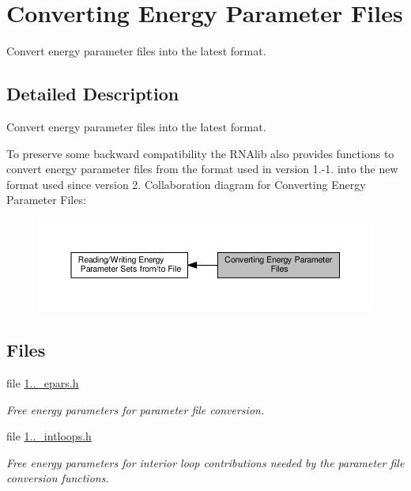 \hypertarget{group__energy__parameters__convert}{}\section{Converting Energy Parameter Files}
\label{group__energy__parameters__convert}


Convert energy parameter files into the latest format.  




\subsection{Detailed Description}
Convert energy parameter files into the latest format. 

To preserve some backward compatibility the R\+N\+Alib also provides functions to convert energy parameter files from the format used in version 1.-\/1. into the new format used since version 2. Collaboration diagram for Converting Energy Parameter Files\+:
\nopagebreak
\begin{figure}[H]
\begin{center}
\leavevmode
\includegraphics[width=350pt]{group__energy__parameters__convert}
\end{center}
\end{figure}
\subsection*{Files}
\begin{DoxyCompactItemize}
\item 
file \hyperlink{1_88_84__epars_8h}{1..\+\_\+epars.\+h}
\begin{DoxyCompactList}\small\item\em Free energy parameters for parameter file conversion. \end{DoxyCompactList}\item 
file \hyperlink{1_88_84__intloops_8h}{1..\+\_\+intloops.\+h}
\begin{DoxyCompactList}\small\item\em Free energy parameters for interior loop contributions needed by the parameter file conversion functions. \end{DoxyCompactList}\end{DoxyCompactItemize}
